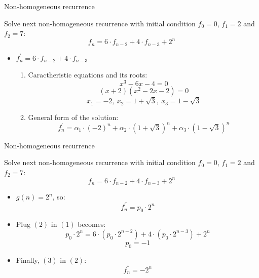 \documentclass{beamer}
\begin{document}
\begin{frame}{Non-homogeneous recurrence}

    {\small Solve next non-homogeneous recurrence with initial condition $f_0=0$, $f_1=2$ and $f_2=7$:
    \begin{equation}\tag{1}
        f_n = 6 \cdot f_{n-2} + 4 \cdot f_{n-3} + 2^n
    \end{equation} }
    \begin{itemize}
        \item $f_n^{'} = 6 \cdot f_{n-2} + 4 \cdot f_{n-3}$
        \begin{enumerate}
            \item Caractheristic equations and its roots:
                $$ x^3 - 6x - 4 = 0 $$
                $$ (x + 2)(x^2 - 2x - 2) = 0 $$
                $$ x_1 = -2,\ x_2=1+\sqrt{3},\ x_3=1-\sqrt{3} $$
            \item General form of the solution:
                $$ f_n^{'} = \alpha_1 \cdot (-2)^n + \alpha_2 \cdot (1+\sqrt{3})^n + \alpha_3 \cdot (1-\sqrt{3})^n $$
        \end{enumerate}
    \end{itemize}
\end{frame}

\begin{frame}{Non-homogeneous recurrence}

    {\small Solve next non-homogeneous recurrence with initial condition $f_0=0$, $f_1=2$ and $f_2=7$:
    \begin{equation}\tag{1}
        f_n = 6 \cdot f_{n-2} + 4 \cdot f_{n-3} + 2^n
    \end{equation} }
    \begin{itemize}
        \item $ g(n) =  2^n$, so:
            \begin{equation}\tag{2}
                f_n^{''} = p_0 \cdot 2^n
            \end{equation}
        \item Plug $(2)$ in $(1)$ becomes:
            $$ p_0 \cdot 2^n = 6 \cdot (p_0 \cdot 2^{n-2}) + 4 \cdot (p_0 \cdot 2^{n-3}) + 2^n $$
            \begin{equation}\tag{3}
                p_0 = -1
            \end{equation}
        \item Finally, $(3)$ in $(2)$:
            $$ f_n^{''} = -2^n $$
    \end{itemize}
\end{frame}
\end{document}
